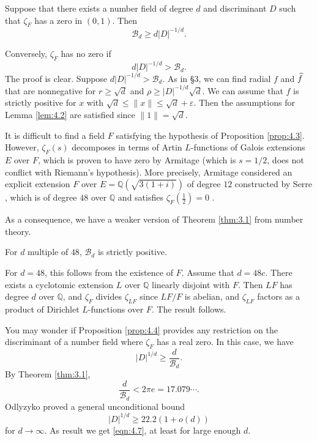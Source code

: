 \begin{proposition}
\label{prop:4.3}
Suppose that there exists a number field of degree $d$ and discriminant $D$ such that $\zeta_F$ has a zero in $(0, 1)$.
Then
\[
    \mathcal{B}_{d} \geq d |D|^{-1/d}.
\]
\end{proposition}

Conversely, $\zeta_F$ has no zero if
\[
    d |D|^{-1/d} > \mathcal{B}_{d}.
\]
The proof is clear.
Suppose $d |D|^{-1/d} > \mathcal{B}_{d}$.
As in \S 3, we can find radial $f$ and $\widehat{f}$ that are nonnegative for $r \geq \sqrt{d}$ and $\rho \geq |D|^{-1/d} \sqrt{d}$.
We can assume that $f$ is strictly positive for $x$ with $\sqrt{d} \leq \|x\| \leq \sqrt{d} + \varepsilon$.
Then the assumptions for Lemma \ref{lem:4.2} are satisfied since $\|1\| = \sqrt{d}$.

It is difficult to find a field $F$ satisfying the hypothesis of Proposition \ref{prop:4.3}.
However, $\zeta_F(s)$ decomposes in terms of Artin $L$-functions of Galois extensions $E$ over $F$, which is proven to have zero by Armitage (which is $s = 1/2$, does not conflict with Riemann's hypothesis).
More precisely, Armitage considered an explicit extension $F$ over $E = \mathbb{Q}(\sqrt{3(1+i)})$ of degree $12$ constructed by Serre \cite{serre1971conducteurs}, which is of degree $48$ over $\mathbb{Q}$ and satisfies $\zeta_F\left(\frac{1}{2}\right) = 0$ \cite[\S 4]{armitage1971zeta}.

As a consequence, we have a weaker version of Theorem \ref{thm:3.1} from number theory.

\begin{proposition}
\label{prop:4.4}
For $d$ multiple of $48$, $\mathcal{B}_{d}$ is strictly positive.
\end{proposition}

For $d = 48$, this follows from the existence of $F$.
Assume that $d = 48c$.
There exists a cyclotomic extension $L$ over $\mathbb{Q}$ linearly disjoint with $F$.
Then $LF$ has degree $d$ over $\mathbb{Q}$, and $\zeta_F$ divides $\zeta_{LF}$ since $LF/F$ is abelian, and $\zeta_{LF}$ factors as a product of Dirichlet $L$-functions over $F$.
The result follows.


You may wonder if Proposition \ref{prop:4.4} provides any restriction on the discriminant of a number field where $\zeta_F$ has a real zero.
In this case, we have
\begin{equation}
    \label{eqn:4.7}
    |D|^{1/d} \geq \frac{d}{\mathcal{B}_d}.
\end{equation}
By Theorem \ref{thm:3.1},
\[
    \frac{d}{\mathcal{B}_d} < 2 \pi e = 17.079\cdots.
\]
Odlyzyko \cite{odlyzko1977lower} proved a general unconditional bound 
\[
    |D|^{1/d} \geq 22.2(1 + o(d))
\]
for $d \to \infty$.
As result we get \eqref{eqn:4.7}, at least for large enough $d$.

